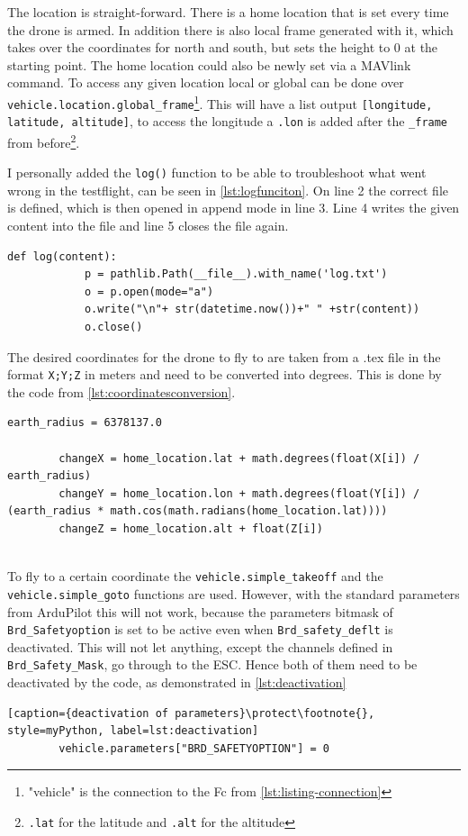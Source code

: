 \documentclass[svgnames]{article}
\begin{document}
	The location is straight-forward. There is a home location that is set every time the drone is armed. In addition there is also local frame generated with it, which takes over the coordinates for north and south, but sets the height to 0 at the starting point. The home location could also be newly set via a MAVlink command. To access any given location local or global can be done over \lstinline|vehicle.location.global_frame|\footnote{"vehicle" is the connection to the \gls{Fc} from \cref{lst:listing-connection}}. This will have a list output \lstinline|[longitude, latitude, altitude]|, to access the longitude a \lstinline|.lon| is added after the \lstinline|_frame| from before\footnote{\lstinline|.lat| for the latitude and \lstinline|.alt| for the altitude}.
	
	I personally added the \lstinline|log()| function to be able to troubleshoot what went wrong in the testflight, can be seen in \cref{lst:logfunciton}. On line 2 the correct file is defined, which is then opened in append mode in line 3. Line 4 writes the given content into the file and line 5 closes the file again.
	
	\begin{lstlisting}[style=myPython, caption={log function}, label=lst:logfunciton]
		def log(content):
			p = pathlib.Path(__file__).with_name('log.txt')
			o = p.open(mode="a")
			o.write("\n"+ str(datetime.now())+"	" +str(content))
			o.close()
	\end{lstlisting}
	
	The desired coordinates for the drone to fly to are taken from a .tex file in the format \lstinline|X;Y;Z| in meters and need to be converted into degrees. This is done by the code from \cref{lst:coordinatesconversion}.
	
	\begin{lstlisting}[style=myPython, caption= coordinate conversion, label=lst:coordinatesconversion]
		earth_radius = 6378137.0
		
		changeX = home_location.lat + math.degrees(float(X[i]) / earth_radius)
		changeY = home_location.lon + math.degrees(float(Y[i]) / (earth_radius * math.cos(math.radians(home_location.lat))))
		changeZ = home_location.alt + float(Z[i])
		
	\end{lstlisting}
	
	To fly to a certain coordinate the \lstinline|vehicle.simple_takeoff| and the \lstinline|vehicle.simple_goto| functions are used. However, with the standard parameters from ArduPilot this will not work, because the parameters bitmask of  \lstinline|Brd_Safetyoption| is set to be active even when \lstinline|Brd_safety_deflt| is deactivated. 
	This will not let anything, except the channels defined in \lstinline|Brd_Safety_Mask|, go through to the \gls{ESC}. Hence both of them need to be deactivated by the code, as demonstrated in \cref{lst:deactivation}
	\begin{lstlisting}[caption={deactivation of parameters}\protect\footnote{}, style=myPython, label=lst:deactivation]
		vehicle.parameters["BRD_SAFETYOPTION"] = 0
	\end{lstlisting}
	
\end{document}
